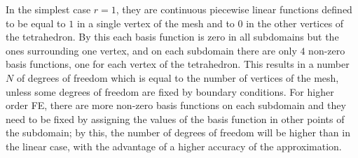 In the simplest case $r=1$, they are continuous piecewise linear functions defined to be equal to $1$ in a single vertex of the mesh and to $0$ in the other vertices of the tetrahedron. 
By this each basis function is zero in all subdomains but the ones surrounding one vertex, and on each subdomain there are only $4$ non-zero basis functions, one for each vertex of the tetrahedron.
This results in a number $N$ of degrees of freedom which is equal to the number of vertices of the mesh, unless some degrees of freedom are fixed by boundary conditions.
For higher order FE, there are more non-zero basis functions on each subdomain and they need to be fixed by assigning the values of the basis function in other points of the subdomain; by this, the number of degrees of freedom will be higher than in the linear case, with the advantage of a higher accuracy of the approximation. \medskip

